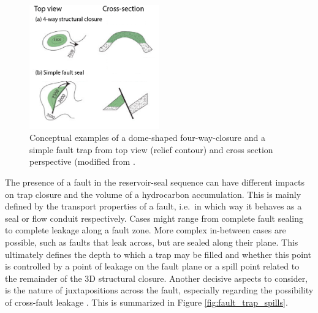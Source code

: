         \begin{figure}[h]
        	\centering
        	\includegraphics[width=0.5\textwidth]{Figures/trap_closure1}
        	\caption{Conceptual examples of a dome-shaped four-way-closure and a simple fault trap from top view (relief contour) and cross section perspective (modified from \citet{dolson2016basics}.}\label{fig:trap_types}
        \end{figure}        
        The presence of a fault in the reservoir-seal sequence can have different impacts on trap closure and the volume of a hydrocarbon accumulation. This is mainly defined by the transport properties of a fault, i.e.\ in which way it behaves as a seal or flow conduit respectively. Cases might range from complete fault sealing to complete leakage along a fault zone. More complex in-between cases are possible, such as faults that leak across, but are sealed along their plane. This ultimately defines the depth to which a trap may be filled and whether this point is controlled by a point of leakage on the fault plane or a spill point related to the remainder of the 3D structural closure. Another decisive aspects to consider, is the nature of juxtapositions across the fault, especially regarding the possibility of cross-fault leakage \citep{van2003lateral}. This is summarized in Figure \ref{fig:fault_trap_spills}.

